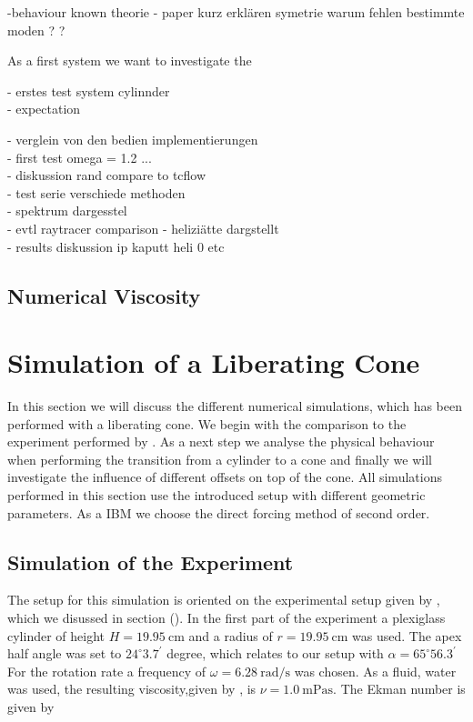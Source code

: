 -behaviour known theorie
- paper kurz erklären symetrie warum fehlen bestimmte moden ? ?

As a first system we want to investigate the

- erstes test system cylinnder\\
- expectation

- verglein von den bedien implementierungen\\
- first test omega = 1.2 ...\\
- diskussion rand compare to tcflow \\
- test serie verschiede methoden\\
- spektrum dargesstel\\
- evtl raytracer  comparison
- heliziätte dargstellt\\
- results diskussion ip kaputt heli 0 etc \\
\subsection{Numerical Viscosity}

\newpage

\section{Simulation of a Liberating Cone}

In this section we will discuss the different numerical simulations, which has been performed
with a liberating cone. We begin with the comparison to the experiment performed by \citep{Beardsley1970}.
As a next step we analyse the physical behaviour when performing the transition from a cylinder
to a cone and finally  we will investigate the influence of different offsets on top of the cone.
All simulations performed in this section use the introduced setup with different geometric parameters.
As a IBM we choose the direct forcing  method of second order.

\subsection{Simulation of the Experiment}

The setup for this simulation is oriented on the experimental setup given by \citep{Beardsley1970}, which
we disussed in section ().
In the first part of the experiment a plexiglass cylinder of height $H=\SI{19.95}{\centi\meter}$ and a radius of
$r=\SI{19.95}{\centi\meter}$ was used. The apex half angle was set to $24^{\circ}3.7^{\prime}$ degree,
which relates to our setup with $\alpha=65^{\circ}56.3^{\prime}$
For the rotation rate a frequency of $\omega =\SI{6.28}{\radian\per\second}$ was chosen.
As a fluid, water was used, the resulting viscosity,given by \citep{tipler2003}, is $\nu = \SI{1.0}{\milli\pascal\second}$.
The Ekman number is given by

